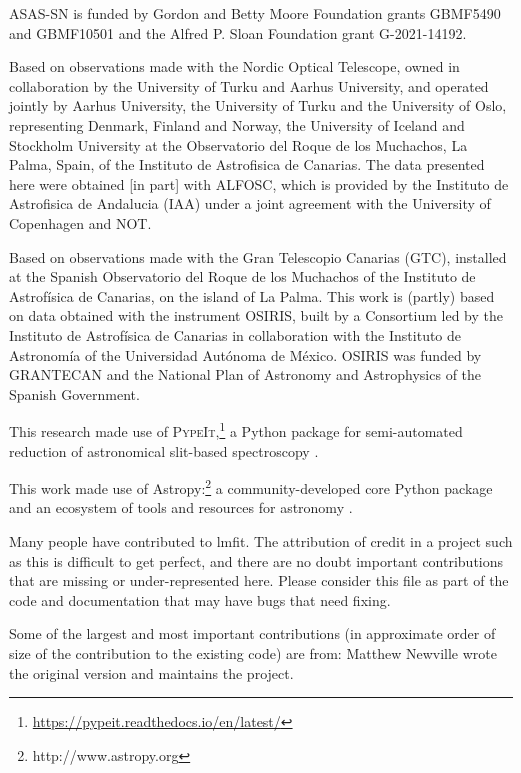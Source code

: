 \begin{acknowledgements}
ASAS-SN is funded by Gordon and Betty Moore Foundation grants
GBMF5490 and GBMF10501 and the Alfred P. Sloan Foundation
grant G-2021-14192.

Based on observations made with the Nordic Optical Telescope, owned in collaboration by the University of Turku and Aarhus University, and operated jointly by Aarhus University, the University of Turku and the University of Oslo, representing Denmark, Finland and Norway, the University of Iceland and Stockholm University at the Observatorio del Roque de los Muchachos, La Palma, Spain, of the Instituto de Astrofisica de Canarias. The data presented here were obtained [in part] with ALFOSC, which is provided by the Instituto de Astrofisica de Andalucia (IAA) under a joint agreement with the University of Copenhagen and NOT.

Based on observations made with the Gran Telescopio Canarias (GTC), installed at the Spanish Observatorio del Roque de los Muchachos of the Instituto de Astrofísica de Canarias, on the island of La Palma. This work is (partly) based on data obtained with the instrument OSIRIS, built by a Consortium led by the Instituto de Astrofísica de Canarias in collaboration with the Instituto de Astronomía of the Universidad Autónoma de México. OSIRIS was funded by GRANTECAN and the National Plan of Astronomy and Astrophysics of the Spanish Government.

This research made use of \textsc{PypeIt},\footnote{\url{https://pypeit.readthedocs.io/en/latest/}}
a Python package for semi-automated reduction of astronomical slit-based spectroscopy
\citep{pypeit:joss_pub, pypeit:zenodo}.

This work made use of Astropy:\footnote{http://www.astropy.org} a community-developed core Python package and an ecosystem of tools and resources for astronomy \citep{astropy:2013, astropy:2018, astropy:2022}.

Many people have contributed to lmfit. The attribution of credit in a project such as this is difficult to get perfect, and there are no doubt important contributions that are missing or under-represented here. Please consider this file as part of the code and documentation that may have bugs that need fixing.

Some of the largest and most important contributions (in approximate order of size of the contribution to the existing code) are from:
 Matthew Newville wrote the original version and maintains the project.
 

\end{acknowledgements}
